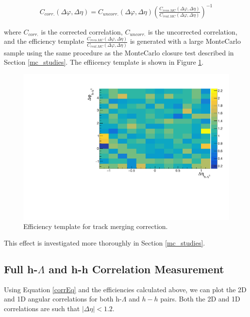 \documentclass[ALICE,manyauthors]{ALICE_analysis_notes}
\begin{document}
\begin{align*}
	C_{corr.}(\Delta\varphi, \Delta\eta) = C_{uncorr.}(\Delta\varphi, \Delta\eta)(\frac{C_{reco. MC}(\Delta\varphi, \Delta\eta)}{C_{real. MC}(\Delta\varphi, \Delta\eta)})^{-1}
\end{align*}

where $C_{corr.}$ is the corrected correlation, $C_{uncorr.}$ is the uncorrected correlation, and the efficiency template $\frac{C_{reco. MC}(\Delta\varphi, \Delta\eta)}{C_{real. MC}(\Delta\varphi, \Delta\eta)}$ is generated with a large MonteCarlo sample using the same procedure as the MonteCarlo closure test described in Section \ref{mc_studies}. The effiicency template is shown in Figure \ref{trackmerge_efficiency_plot}.


\begin{figure}[ht]
\centering
\includegraphics[width=5in]{figures/trackmerge_efficiency_PLACEHOLDER.pdf}
\caption{Efficiency template for track merging correction.}
\label{trackmerge_efficiency_plot}
\end{figure}

This effect is investigated more thoroughly in Section \ref{mc_studies}.

\subsection{Full h-$\Lambda$ and h-h Correlation Measurement}

Using Equation \ref{corrEq} and the efficiencies calculated above, we can plot the 2D and 1D angular correlations for both h-$\Lambda$ and $h-h$ pairs. Both the 2D and 1D correlations are such that $|\Delta\eta| < 1.2$.
\end{document}
